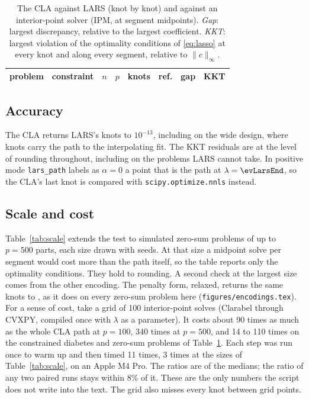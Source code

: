 \documentclass[11pt]{article}
\theoremstyle{remark}
\begin{document}
\begin{table}[!htbp]
\centering
\small\setlength{\tabcolsep}{3.5pt}
\begin{tabular}{llrrrlcc}
\toprule
problem & constraint & $n$ & $p$ & knots & ref. & gap & KKT \\
\midrule

\end{tabular}
\caption{The CLA against LARS (knot by knot) and against an interior-point solver (IPM,
at segment midpoints). \emph{Gap}: largest discrepancy, relative to the largest
coefficient. \emph{KKT}: largest violation of the optimality conditions of
\eqref{eq:lasso} at every knot and along every segment, relative to $\|c\|_\infty$.}
\label{tab:evidence}
\end{table}

\subsection{Accuracy}
\label{sec:accuracy}

The CLA returns LARS's knots to $10^{-13}$, including on the wide design, where
\evWideKnots{} knots carry the path to the interpolating fit. The KKT residuals are at
the level of rounding throughout, including on the problems LARS cannot take. In
positive mode \texttt{lars\_path} labels as $\alpha=0$ a point that is the path at
$\lambda=\evLarsEnd$, so the CLA's last knot is compared with
\texttt{scipy.optimize.nnls} \cite{lawson1974} instead.

\subsection{Scale and cost}
\label{sec:scale}

Table~\ref{tab:scale} extends the test to simulated zero-sum
problems of up to $p=500$ parts, each size drawn with \scSeeds{} seeds. At that size a midpoint solve per segment would cost
more than the path itself, so the table reports only the optimality conditions. They
hold to rounding. A second check at the largest size comes from the other encoding. The
penalty form, relaxed, returns the same \encLargestKnots{} knots to \encLargestGap{}, as
it does on every zero-sum problem here (\texttt{figures/encodings.tex}).
For a sense of cost, take a grid of 100 interior-point solves (Clarabel through CVXPY,
compiled once with $\lambda$ as a parameter). It costs about 90 times as much as the
whole CLA path at $p=100$, 340 times at $p=500$, and 14 to 110 times on the constrained
diabetes and zero-sum problems of Table~\ref{tab:evidence}. Each step was run once to
warm up and then timed 11 times, 3 times at the sizes of Table~\ref{tab:scale}, on an
Apple M4 Pro. The ratios are of the medians; the ratio of any two paired runs stays
within 8\% of it. These are the only numbers the script does not write into the text.
The grid also misses every knot between grid points.
\end{document}
